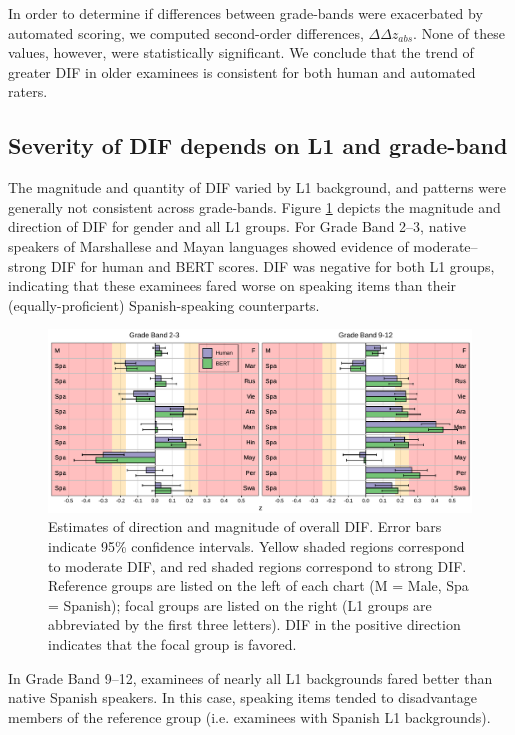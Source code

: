 \documentclass [PhD] {uclathes}
\begin{document}
In order to determine if differences between grade-bands were exacerbated by automated scoring, we computed second-order differences, $\Delta \Delta z_{abs}$. None of these values, however, were statistically significant. We conclude that the trend of greater DIF in older examinees is consistent for both human and automated raters. 

\subsection{Severity of DIF depends on L1 and grade-band}

The magnitude and quantity of DIF varied by L1 background, and patterns were generally not consistent across grade-bands. Figure \ref{fig:z_ovr} depicts the magnitude and direction of DIF for gender and all L1 groups. For Grade Band 2–3, native speakers of Marshallese and Mayan languages showed evidence of moderate–strong DIF for human and BERT scores. DIF was negative for both L1 groups, indicating that these examinees fared worse on speaking items than their (equally-proficient) Spanish-speaking counterparts. 

\begin{figure}[t]
    \centering
    \includegraphics[width=16cm]{figures/20230504_ETS-DIF_BERT_z_ovr_edit.pdf}
    \caption{Estimates of direction and magnitude of overall DIF. Error bars indicate 95\% confidence intervals. Yellow shaded regions correspond to moderate DIF, and red shaded regions correspond to strong DIF. Reference groups are listed on the left of each chart (M = Male, Spa = Spanish); focal groups are listed on the right (L1 groups are abbreviated by the first three letters). DIF in the positive direction indicates that the focal group is favored.}
    \label{fig:z_ovr}
\end{figure}

In Grade Band 9–12, examinees of nearly all L1 backgrounds fared better than native Spanish speakers. In this case, speaking items tended to disadvantage members of the reference group (i.e. examinees with Spanish L1 backgrounds). 
\end{document}
